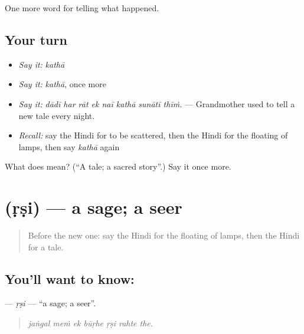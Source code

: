 \begin{grammarlens}[title={What you've built}]
One more word for telling what happened.
\end{grammarlens}

\subsection*{Your turn}
\begin{itemize}
\raggedright
  \item \emph{Say it:} \emph{kathā}
  \item \emph{Say it:} \emph{kathā}, once more
  \item \emph{Say it:} \emph{dādī har rāt ek naī kathā sunātī thīṁ.} — Grandmother used to tell a new tale every night.
  \item \emph{Recall:} say the Hindi for to be scattered, then the Hindi for the floating of lamps, then say \emph{kathā} again
\end{itemize}

\begin{tcolorbox}[breakable,colback=teal!4,colframe=teal!35!black,title={Before you move on}]
What does  mean? (\textquotedblleft{}A tale; a sacred story\textquotedblright{}.) Say it once more.
\end{tcolorbox}
\section[\texorpdfstring{\hi{ऋषि} (ṛṣi)}{ऋषि (ṛṣi)}]{ (ṛṣi) — a sage; a seer}

\label{lesson:HI-C334-rsi}



\begin{quote}
Before the new one: say the Hindi for the floating of lamps, then the Hindi for a tale.
\end{quote}

\subsection*{You'll want to know: }
\textbf{} — \emph{ṛṣi} — \textquotedblleft{}a sage; a seer\textquotedblright{}.

\begin{quote}
      
\end{quote}

\begin{quote}
\emph{jaṅgal meṁ ek būṛhe ṛṣi rahte the.}
\end{quote}

